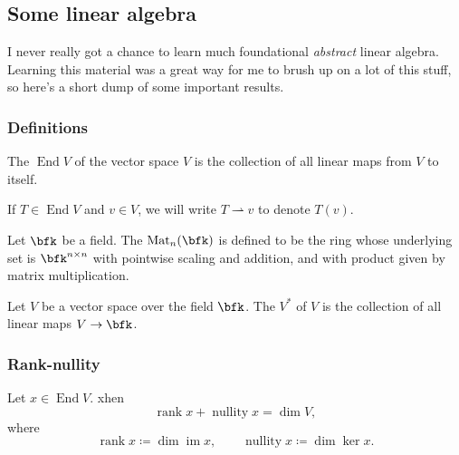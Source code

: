 \documentclass{article}
\DeclareMathOperator{\End}{End}
\DeclareMathOperator{\Mat}{Mat}
\DeclareMathOperator{\im}{im}
\DeclareMathOperator{\rank}{rank}
\DeclareMathOperator{\nullity}{nullity}
\begin{document}
\subsection{Some linear algebra}

I never really got a chance to learn much foundational \textit{abstract} linear algebra.
Learning this material was a great way for me to brush up on a lot of this stuff, so here's a short dump of some important results.

\subsubsection{Definitions}

\begin{definition}
    The  $\End V$ of the vector space $V$ is the collection of all linear maps from $V$ to itself.

    If $T \in \End V$ and $v \in V$, we will write $T \rightharpoonup v$ to denote $T(v)$.
\end{definition}

\begin{definition}
    Let $\bfk$ be a field.
    The  $\Mat_n(\bfk)$ is defined to be the ring whose underlying set is $\bfk^{n \times n}$ with pointwise scaling and addition, and with product given by matrix multiplication.
\end{definition}

\begin{definition}
    Let $V$ be a vector space over the field $\bfk$.
    The  $V^\ast$ of $V$ is the collection of all linear maps $V \to \bfk$.
\end{definition}

\subsubsection{Rank-nullity}

\begin{theorem}
    \label{thm:RankNullity}
    Let $x \in \End V$.
    xhen
    \[
        \rank x + \nullity x
        =
        \dim V,
    \]
    where
    \[
        \rank x
        \coloneq
        \dim \im x
        ,\qquad
        \nullity x
        \coloneq
        \dim \ker x.
    \]
\end{theorem}
\end{document}
